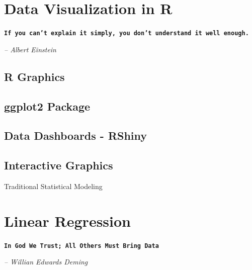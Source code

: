 \documentclass[10pt, letterpaper, twoside]{memoir}\usepackage{knitr}
\makeatletter
\newcommand{\chapterendsymbol}{
    \vspace{24pt}
    \Huge
    \hrulefill \hspace{0.1in} \hspace{0.1in} \hrulefill
    \normalsize
    }
\renewcommand\part{%
  \if@openright
    \cleardoublepage
  \else
    \clearpage
  \fi
  \thispagestyle{empty}
  \null\vfil
  \secdef\@part\@spart
  }
\makeatother
\begin{document}

\chapter{Data Visualization in R}

\begin{flushright}

\textbf{\texttt{If you can't explain it simply, you don't understand it well enough.}}

\emph{-- Albert Einstein}

\end{flushright}

\vspace{12pt}


\section{R Graphics}

\section{ggplot2 Package}

\section{Data Dashboards - RShiny}

\section{Interactive Graphics}


\chapterendsymbol



\part{Traditional Statistical Modeling}




\chapter{Linear Regression}

\begin{flushright}

\textbf{\texttt{In God We Trust; All Others Must Bring Data}}

\emph{-- Willian Edwards Deming}

\end{flushright}
\end{document}
